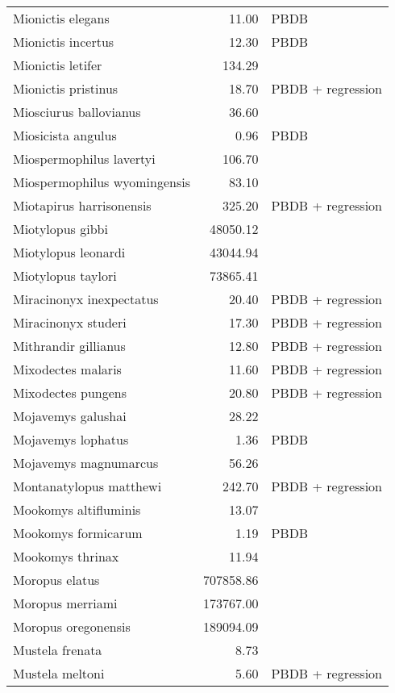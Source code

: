 \begin{table}[ht]
\begin{tabular}{lrl}
  Mionictis elegans & 11.00 & PBDB \\ 
  Mionictis incertus & 12.30 & PBDB \\ 
  Mionictis letifer & 134.29 & \cite{Tomiya2013} \\ 
  Mionictis pristinus & 18.70 & PBDB + regression \\ 
  Miosciurus ballovianus & 36.60 & \cite{Tomiya2013} \\ 
  Miosicista angulus & 0.96 & PBDB \\ 
  Miospermophilus lavertyi & 106.70 & \cite{Tomiya2013} \\ 
  Miospermophilus wyomingensis & 83.10 & \cite{Tomiya2013} \\ 
  Miotapirus harrisonensis & 325.20 & PBDB + regression \\ 
  Miotylopus gibbi & 48050.12 & \cite{Tomiya2013} \\ 
  Miotylopus leonardi & 43044.94 & \cite{Tomiya2013} \\ 
  Miotylopus taylori & 73865.41 & \cite{Tomiya2013} \\ 
  Miracinonyx inexpectatus & 20.40 & PBDB + regression \\ 
  Miracinonyx studeri & 17.30 & PBDB + regression \\ 
  Mithrandir gillianus & 12.80 & PBDB + regression \\ 
  Mixodectes malaris & 11.60 & PBDB + regression \\ 
  Mixodectes pungens & 20.80 & PBDB + regression \\ 
  Mojavemys galushai & 28.22 & \cite{Tomiya2013} \\ 
  Mojavemys lophatus & 1.36 & PBDB \\ 
  Mojavemys magnumarcus & 56.26 & \cite{Tomiya2013} \\ 
  Montanatylopus matthewi & 242.70 & PBDB + regression \\ 
  Mookomys altifluminis & 13.07 & \cite{Tomiya2013} \\ 
  Mookomys formicarum & 1.19 & PBDB \\ 
  Mookomys thrinax & 11.94 & \cite{Tomiya2013} \\ 
  Moropus elatus & 707858.86 & \cite{Tomiya2013} \\ 
  Moropus merriami & 173767.00 & \cite{McKenna2011} \\ 
  Moropus oregonensis & 189094.09 & \cite{Tomiya2013} \\ 
  Mustela frenata & 8.73 & \cite{Smith2004} \\ 
  Mustela meltoni & 5.60 & PBDB + regression \\ 

\end{tabular}
\end{table}
